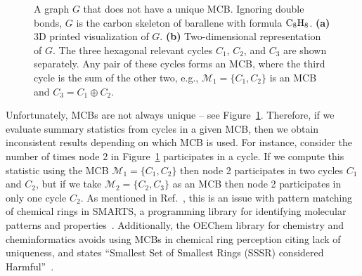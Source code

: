 \documentclass[fleqn,11pt]{article}
\newcommand\calM{\mathcal{M}}
\begin{document}
\begin{figure}[t]
%		
	\caption{
		A graph $G$ that does not have a unique MCB. Ignoring double bonds, $G$ is the carbon skeleton of barallene with formula $\rm C_8 H_8$. \textbf{(a)} 3D printed visualization of $G$. \textbf{(b)} Two-dimensional representation of $G$. The three hexagonal relevant cycles $C_1$, $C_2$, and $C_3$ are shown separately. Any pair of these cycles forms an MCB, where the third cycle is the sum of the other two, e.g., $\calM_1=\{C_1,C_2\}$ is an MCB and $C_3=C_1\oplus C_2$.
	}
	\label{fig:MCB_Unique}
\end{figure}

Unfortunately, MCBs are not always unique -- see Figure~\ref{fig:MCB_Unique}. Therefore, if we evaluate summary statistics from cycles in a given MCB, then we obtain inconsistent results depending on which MCB is used. For instance, consider the number of times node 2 in Figure~\ref{fig:MCB_Unique} participates in a cycle. If we compute this statistic using the MCB $\calM_1=\{C_1,C_2\}$ then node 2 participates in two cycles $C_1$ and $C_2$, but if we take $\calM_2=\{C_2,C_3\}$ as an MCB then node 2 participates in only one cycle $C_2$. As mentioned in Ref.~\cite{kolodzikUnique2012}, this is an issue with pattern matching of chemical rings in SMARTS, {a programming library for identifying molecular patterns and properties}~\cite{SMARTS}. Additionally, the OEChem {library for chemistry and cheminformatics} avoids using MCBs in chemical ring perception citing lack of uniqueness, and states ``Smallest Set of Smallest Rings (SSSR) considered Harmful''~\cite{SSSR_Harmful}.%
\end{document}
